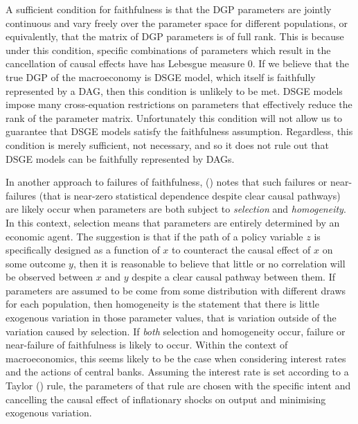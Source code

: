 \documentclass{article}
\begin{document}
A sufficient condition for faithfulness is that the DGP parameters are jointly continuous and vary freely over the parameter space \parencite{steel2006homogeneity} for different populations, or equivalently, that the matrix of DGP parameters is of full rank. This is because under this condition, specific combinations of parameters which result in the cancellation of causal effects have has Lebesgue measure 0. If we believe that the true DGP of the macroeconomy is DSGE model, which itself is faithfully represented by a DAG, then this condition is unlikely to be met. DSGE models impose many cross-equation restrictions on parameters that effectively reduce the rank of the parameter matrix. Unfortunately this condition will not allow us to guarantee that DSGE models satisfy the faithfulness assumption. Regardless, this condition is merely sufficient, not necessary, and so it does not rule out that DSGE models can be faithfully represented by DAGs. 

In another approach to failures of faithfulness, \citeauthor{steel2006homogeneity} (\citeyear{steel2006homogeneity}) notes that such failures or near-failures (that is near-zero statistical dependence despite clear causal pathways) are likely occur when parameters are both subject to \textit{selection} and \textit{homogeneity}. In this context, selection means that parameters are entirely determined by an economic agent. The suggestion is that if the path of a policy variable $z$ is specifically designed as a function of $x$ to counteract the causal effect of $x$ on some outcome $y$, then it is reasonable to believe that little or no correlation will be observed between $x$ and $y$ despite a clear causal pathway between them. If parameters are assumed to be come from some distribution with different draws for each population, then homogeneity is the statement that there is little exogenous variation in those parameter values, that is variation outside of the variation caused by selection. If \textit{both} selection and homogeneity occur, failure or near-failure of faithfulness is likely to occur. Within the context of macroeconomics, this seems likely to be the case when considering interest rates and the actions of central banks. Assuming the interest rate is set according to a Taylor (\citeyear{taylor1993discretion}) rule, the parameters of that rule are chosen with the specific intent and cancelling the causal effect of inflationary shocks on output and minimising exogenous variation. 
\end{document}
